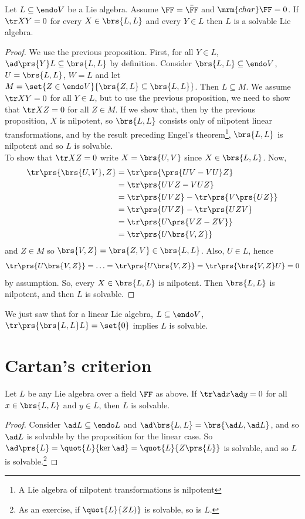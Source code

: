 \documentclass[10pt,a4paper,twoside,openany,hidelinks]{book}
\begin{document}
\begin{proposition}
Let $L \subseteq \endo V$ be a Lie algebra. Assume $\FF = \bar{\FF}$ and $\mrm{char}\FF = 0$. If $\tr XY = 0$ for every $X \in \brs{L,L}$ and every $Y \in L$ then $L$ is a solvable Lie algebra.
\end{proposition}
\begin{proof}
We use the previous proposition. First, for all $Y \in L$, $\ad\prs{Y}L \subseteq \brs{L,L}$ by definition. Consider $\brs{L,L} \subseteq \endo V$, $U = \brs{L,L}$, $W = L$ and let $M = \set{Z \in \endo V}{\brs{Z,L} \subseteq \brs{L,L}}$. Then $L \subseteq M$.
We assume $\tr XY = 0$ for all $Y \in L$, but to use the previous proposition, we need to show that $\tr XZ = 0$ for all $Z \in M$. If we show that, then by the previous proposition, $X$ is nilpotent, so $\brs{L,L}$ consists only of nilpotent linear transformations, and by the result preceding Engel's theorem\footnote{A Lie algebra of nilpotent transformations is nilpotent}, $\brs{L,L}$ is nilpotent and so $L$ is solvable.\\
To show that $\tr XZ = 0$ write $X = \brs{U,V}$ since $X \in \brs{L,L}$. Now,
\begin{align*}
\tr\prs{\brs{U,V},Z} &= \tr \prs{\prs{UV - VU}Z} \\&= \tr \prs{UVZ - VUZ} \\&= \tr\prs{UVZ} - \tr\prs{V\prs{UZ}} \\&= \tr \prs{UVZ} - \tr\prs{UZV} \\
&= \tr\prs{U\prs{VZ - ZV}} \\
&= \tr\prs{U \brs{V,Z}}
\end{align*}
and $Z \in M$ so $\brs{V,Z} = \brs{Z,V} \in \brs{L,L}$.
Also, $U \in L$, hence
\[\tr\prs{U \brs{V,Z}} = \ldots = \tr \prs{U \brs{V,Z}} = \tr \prs{\brs{V,Z} U} = 0\]
by assumption.
So, every $X \in \brs{L,L}$ is nilpotent. Then $\brs{L,L}$ is nilpotent, and then $L$ is solvable.
\end{proof}
\begin{remark}
We just saw that for a linear Lie algebra, $L \subseteq \endo V$, $\tr\prs{\brs{L,L}L} = \set{0}$ implies $L$ is solvable.
\end{remark}

\section{Cartan's criterion}
\begin{theorem}
Let $L$ be any Lie algebra over a field $\FF$ as above. If $\tr \ad x \ad y = 0$ for all $x\in \brs{L,L}$ and $y \in L$, then $L$ is solvable. 
\end{theorem}
\begin{proof}
Consider $\ad L \subseteq \endo L$ and $\ad \brs{L,L} = \brs{\ad L, \ad L}$, and so $\ad L$ is solvable by the proposition for the linear case. So $\ad\prs{L} = \quot{L}{\ker \ad} = \quot{L}{Z\prs{L}}$ is solvable, and so $L$ is solvable.\footnote{As an exercise, if $\quot{L}{ZL)}$ is solvable, so is $L$.} 
\end{proof}
\end{document}

